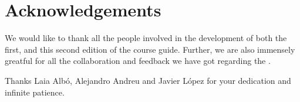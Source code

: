 \chapter*{Acknowledgements}

We would like to thank all the people involved in the development of both the first, and this second edition of the course guide. Further, we are also immensely greatful for all the collaboration and feedback we have got regarding the \emph{}.

Thanks Laia Alb\'{o}, Alejandro Andreu and Javier L\'{o}pez for your dedication and infinite patience.
